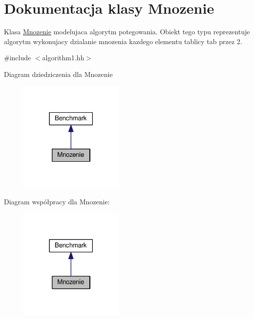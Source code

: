 \hypertarget{class_mnozenie}{\section{Dokumentacja klasy Mnozenie}
\label{class_mnozenie}
}


Klasa \hyperlink{class_mnozenie}{Mnozenie} modelujaca algorytm potegowania. Obiekt tego typu reprezentuje algorytm wykonujacy dzialanie mnozenia kazdego elementu tablicy tab przez 2.  




{\ttfamily \#include $<$algorithm1.\-hh$>$}



Diagram dziedziczenia dla Mnozenie\nopagebreak
\begin{figure}[H]
\begin{center}
\leavevmode
\includegraphics[width=146pt]{class_mnozenie__inherit__graph}
\end{center}
\end{figure}


Diagram współpracy dla Mnozenie\-:\nopagebreak
\begin{figure}[H]
\begin{center}
\leavevmode
\includegraphics[width=146pt]{class_mnozenie__coll__graph}
\end{center}
\end{figure}

